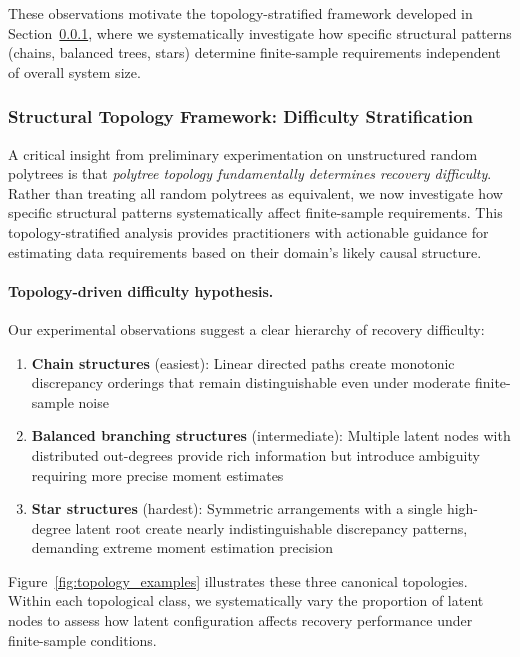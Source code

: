 \documentclass[11pt,a4paper]{article}
\numberwithin{equation}{section}
\begin{document}
These observations motivate the topology-stratified framework developed in Section~\ref{subsubsec:topology_framework}, where we systematically investigate how specific structural patterns (chains, balanced trees, stars) determine finite-sample requirements independent of overall system size.


\subsubsection{Structural Topology Framework: Difficulty Stratification}
\label{subsubsec:topology_framework}

A critical insight from preliminary experimentation on unstructured random polytrees is that \emph{polytree topology fundamentally determines recovery difficulty}. Rather than treating all random polytrees as equivalent, we now investigate how specific structural patterns systematically affect finite-sample requirements. This topology-stratified analysis provides practitioners with actionable guidance for estimating data requirements based on their domain's likely causal structure.

\paragraph{Topology-driven difficulty hypothesis.} Our experimental observations suggest a clear hierarchy of recovery difficulty:

\begin{enumerate}[label=(\arabic*)]
\item \textbf{Chain structures} (easiest): Linear directed paths create monotonic discrepancy orderings that remain distinguishable even under moderate finite-sample noise

\item \textbf{Balanced branching structures} (intermediate): Multiple latent nodes with distributed out-degrees provide rich information but introduce ambiguity requiring more precise moment estimates

\item \textbf{Star structures} (hardest): Symmetric arrangements with a single high-degree latent root create nearly indistinguishable discrepancy patterns, demanding extreme moment estimation precision
\end{enumerate}

Figure~\ref{fig:topology_examples} illustrates these three canonical topologies. Within each topological class, we systematically vary the proportion of latent nodes to assess how latent configuration affects recovery performance under finite-sample conditions.
\end{document}
